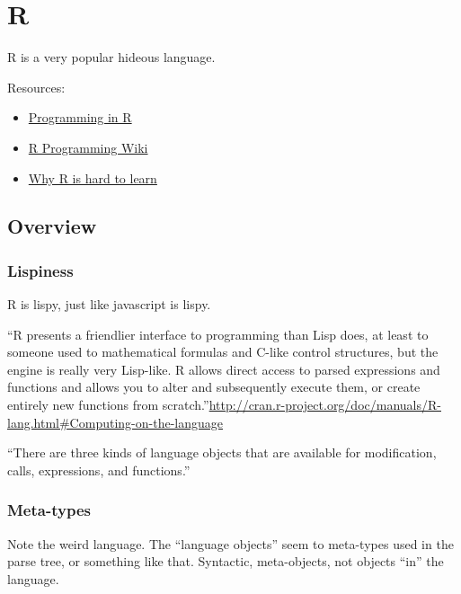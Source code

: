 \chapter{R}

R is a very popular hideous language.

Resources:

\begin{itemize}
\item \href{http://manuals.bioinformatics.ucr.edu/home/programming-in-r}{Programming in R}
\item \href{http://en.wikibooks.org/wiki/R_Programming}{R Programming Wiki}
\item \href{http://r4stats.com/2012/06/13/why-r-is-hard-to-learn/}{Why R is hard to learn}
\end{itemize}

\section{Overview}
\subsection{Lispiness}
\label{sect:rlispiness}

R is lispy, just like javascript is lispy.

``R presents a friendlier interface to programming than Lisp does, at least to someone used to mathematical formulas and C-like control structures, but the engine is really very Lisp-like. R allows direct access to parsed expressions and functions and allows you to alter and subsequently execute them, or create entirely new functions from scratch.''\url{http://cran.r-project.org/doc/manuals/R-lang.html#Computing-on-the-language}

``There are three kinds of language objects that are available for modification, calls, expressions, and functions.''

\subsection{Meta-types}
\label{sect:rmetatypes}

\begin{ednote}
  Note the weird language.  The ``language objects'' seem to
  meta-types used in the parse tree, or something like that.
  Syntactic, meta-objects, not objects ``in'' the language.
\end{ednote}


